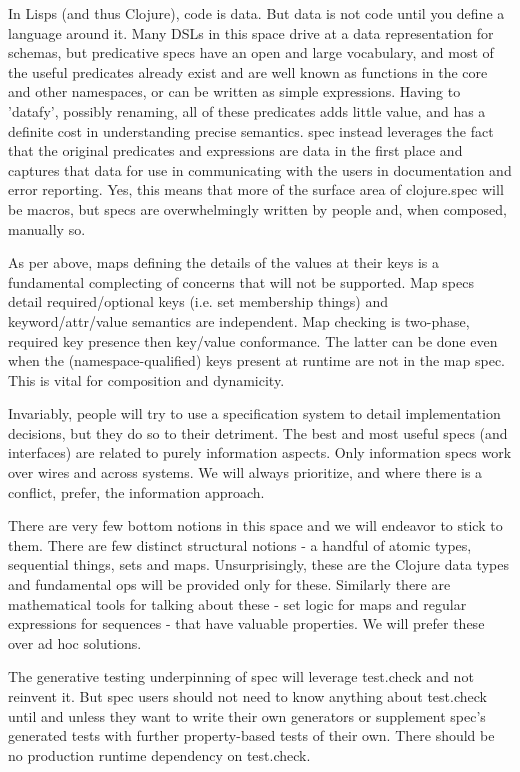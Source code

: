In Lisps (and thus Clojure), code is data. But data is not code until you define
a language around it. Many DSLs in this space drive at a data representation for
schemas, but predicative specs have an open and large vocabulary, and most of
the useful predicates already exist and are well known as functions in the core
and other namespaces, or can be written as simple expressions. Having to
'datafy', possibly renaming, all of these predicates adds little value, and has
a definite cost in understanding precise semantics. spec instead leverages the
fact that the original predicates and expressions are data in the first place
and captures that data for use in communicating with the users in documentation
and error reporting. Yes, this means that more of the surface area of
clojure.spec will be macros, but specs are overwhelmingly written by people and,
when composed, manually so.

As per above, maps defining the details of the values at their keys is a
fundamental complecting of concerns that will not be supported. Map specs detail
required/optional keys (i.e. set membership things) and keyword/attr/value
semantics are independent. Map checking is two-phase, required key presence then
key/value conformance. The latter can be done even when the
(namespace-qualified) keys present at runtime are not in the map spec. This is
vital for composition and dynamicity.


Invariably, people will try to use a specification system to detail
implementation decisions, but they do so to their detriment. The best and most
useful specs (and interfaces) are related to purely information aspects. Only
information specs work over wires and across systems. We will always prioritize,
and where there is a conflict, prefer, the information approach.

There are very few bottom notions in this space and we will endeavor to stick to
them. There are few distinct structural notions - a handful of atomic types,
sequential things, sets and maps. Unsurprisingly, these are the Clojure data
types and fundamental ops will be provided only for these. Similarly there are
mathematical tools for talking about these - set logic for maps and regular
expressions for sequences - that have valuable properties. We will prefer these
over ad hoc solutions.

The generative testing underpinning of spec will leverage test.check and not
reinvent it. But spec users should not need to know anything about test.check
until and unless they want to write their own generators or supplement spec's
generated tests with further property-based tests of their own. There should be
no production runtime dependency on test.check.

